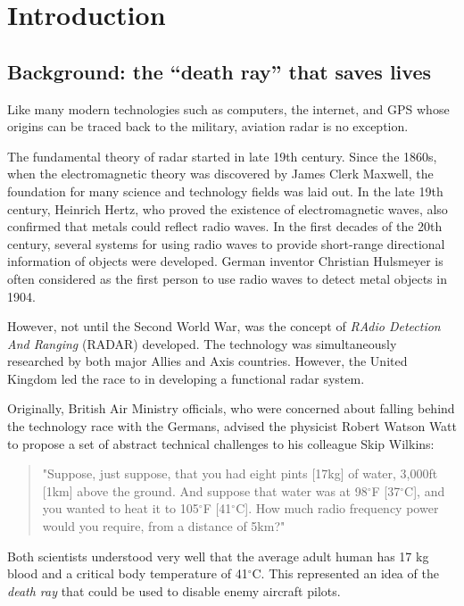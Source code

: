 \chapter{Introduction} \label{chap:intro}

\section{Background: the ``death ray'' that saves lives}

Like many modern technologies such as computers, the internet, and GPS whose origins can be traced back to the military, aviation radar is no exception. 

The fundamental theory of radar started in late 19th century. Since the 1860s, when the electromagnetic theory was discovered by James Clerk Maxwell, the foundation for many science and technology fields was laid out. In the late 19th century, Heinrich Hertz, who proved the existence of electromagnetic waves, also confirmed that metals could reflect radio waves. In the first decades of the 20th century, several systems for using radio waves to provide short-range directional information of objects were developed. German inventor Christian Hulsmeyer is often considered as the first person to use radio waves to detect metal objects in 1904.

However, not until the Second World War, was the concept of \emph{RAdio Detection And Ranging} (RADAR) developed. The technology was simultaneously researched by both major Allies and Axis countries. However, the United Kingdom led the race to in developing a functional radar system. 

Originally, British Air Ministry officials, who were concerned about falling behind the technology race with the Germans, advised the physicist Robert Watson Watt to propose a set of abstract technical challenges to his colleague Skip Wilkins:

\begin{quotation}
\noindent"Suppose, just suppose, that you had eight pints [17kg] of water, 3,000ft [1km] above the ground. And suppose that water was at 98$^\circ$F [37$^\circ$C], and you wanted to heat it to 105$^\circ$F [41$^\circ$C]. How much radio frequency power would you require, from a distance of 5km?"
\end{quotation}

Both scientists understood very well that the average adult human has 17 kg blood and a critical body temperature of 41$^\circ$C. This represented an idea of the \emph{death ray} that could be used to disable enemy aircraft pilots.

